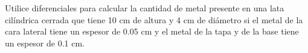 \item Utilice diferenciales para calcular la cantidad de metal presente en una lata cilíndrica cerrada que tiene 10 cm de altura y 4 cm de diámetro si el metal de la cara lateral tiene un espesor de 0.05 cm y el metal de la tapa y de la base tiene un espesor de 0.1 cm.
